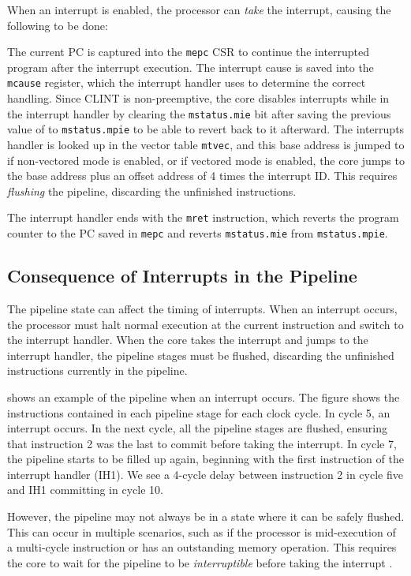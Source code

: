 When an interrupt is enabled, the processor can \textit{take} the interrupt, causing the following to be done:

The current PC is captured into the \lstinline{mepc} CSR to continue the interrupted program after the interrupt execution. 
The interrupt cause is saved into the \lstinline{mcause} register, which the interrupt handler uses to determine the correct handling.
Since CLINT is non-preemptive, the core disables interrupts while in the interrupt handler by clearing the \lstinline{mstatus.mie} bit after saving the previous value of  to \lstinline{mstatus.mpie} to be able to revert back to it afterward. 
The interrupts handler is looked up in the vector table \lstinline{mtvec}, and this base address is jumped to if non-vectored mode is enabled, or if vectored mode is enabled, the core jumps to the base address plus an offset address of 4 times the interrupt ID. This requires \textit{flushing} the pipeline, discarding the unfinished instructions.


The interrupt handler ends with the \lstinline{mret} instruction, which reverts the program counter to the PC saved in \lstinline{mepc} and reverts \lstinline{mstatus.mie} from \lstinline{mstatus.mpie}.

\subsection{Consequence of Interrupts in the Pipeline}

The pipeline state can affect the timing of interrupts. When an interrupt occurs, the processor must halt normal execution at the current instruction and switch to the interrupt handler. When the core takes the interrupt and jumps to the interrupt handler, the pipeline stages must be flushed, discarding the unfinished instructions currently in the pipeline. 

 shows an example of the pipeline when an interrupt occurs. The figure shows the instructions contained in each pipeline stage for each clock cycle. In cycle 5, an interrupt occurs. In the next cycle, all the pipeline stages are flushed, ensuring that instruction 2 was the last to commit before taking the interrupt. In cycle 7, the pipeline starts to be filled up again, beginning with the first instruction of the interrupt handler (IH1). We see a 4-cycle delay between instruction 2 in cycle five and IH1 committing in cycle 10.

However, the pipeline may not always be in a state where it can be safely flushed. This can occur in multiple scenarios, such as if the processor is mid-execution of a multi-cycle instruction or has an outstanding memory operation. This requires the core to wait for the pipeline to be \textit{interruptible} before taking the interrupt \cite{taylorAdvancedRISCVVerification2023}.



